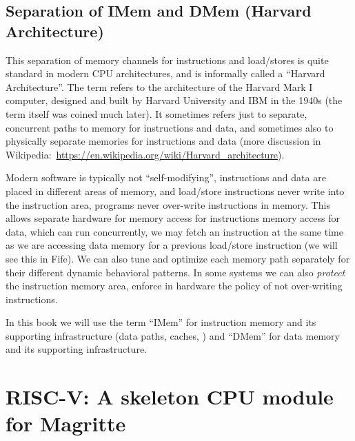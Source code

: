 
\subsection{Separation of IMem and DMem (Harvard Architecture)}


This separation of memory channels for instructions and load/stores is
quite standard in modern CPU architectures, and is informally called a
``Harvard Architecture''.  The term refers to the architecture of the
Harvard Mark I computer, designed and built by Harvard University and
IBM in the 1940s (the term itself was coined much later).  It
sometimes refers just to separate, concurrent paths to memory for
instructions and data, and sometimes also to physically separate
memories for instructions and data (more discussion in
Wikipedia:~\url{https://en.wikipedia.org/wiki/Harvard_architecture}).

Modern software is typically not ``self-modifying'', {\ie}
instructions and data are placed in different areas of memory, and
load/store instructions never write into the instruction area, {\ie}
programs never over-write instructions in memory.  This allows
separate hardware for memory access for instructions {\vs} memory
access for data, which can run concurrently, {\ie} we may fetch an
instruction at the same time as we are accessing data memory for a
previous load/store instruction (we will see this in Fife).  We can
also tune and optimize each memory path separately for their different
dynamic behavioral patterns.  In some systems we can also
\emph{protect} the instruction memory area, {\ie} enforce in hardware
the policy of not over-writing instructions.


In this book we will use the term ``IMem'' for instruction memory and
its supporting infrastructure (data paths, caches, {\etc}) and
``DMem'' for data memory and its supporting infrastructure.


\section{RISC-V: A skeleton CPU module for Magritte}

